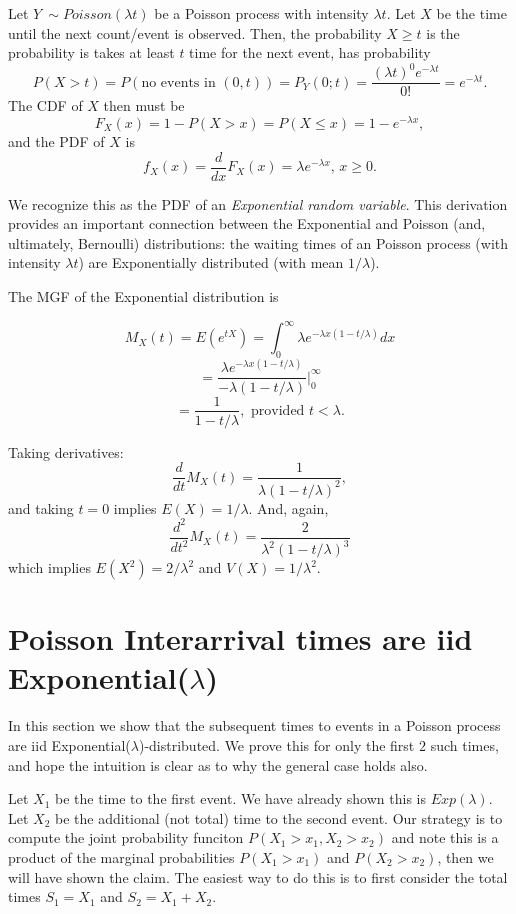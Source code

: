 \documentclass[]{book}
\begin{document}
Let \(Y~\sim Poisson(\lambda t)\) be a Poisson process with intensity
\(\lambda t\). Let \(X\) be the time until the next count/event is
observed. Then, the probability \(X \geq t\) is the probability is takes
at least \(t\) time for the next event, has probability
\[P(X > t) = P(\text{no events in }(0,t)) = P_Y(0;t) = \frac{(\lambda t)^0 e^{-\lambda t}}{0!} = e^{-\lambda t}.\]
The CDF of \(X\) then must be
\[F_X(x) = 1-P(X > x) = P(X\leq x) = 1-e^{-\lambda x},\] and the PDF of
\(X\) is
\[f_X(x) = \frac{d}{dx}F_X(x) = \lambda e^{-\lambda x}, \, x\geq 0.\]

We recognize this as the PDF of an \emph{Exponential random variable}.
This derivation provides an important connection between the Exponential
and Poisson (and, ultimately, Bernoulli) distributions: the waiting
times of an Poisson process (with intensity \(\lambda t\)) are
Exponentially distributed (with mean \(1/\lambda\)).

The MGF of the Exponential distribution is

\[M_X(t) = E(e^{tX})  = \int_{0}^\infty \lambda e^{-\lambda x(1-t/\lambda)}dx\]
\[ = \frac{\lambda e^{-\lambda x(1-t/\lambda)}}{-\lambda (1-t/\lambda)}|_0^\infty\]
\[ = \frac{1}{1-t/\lambda}, \text{ provided }t < \lambda.\]

Taking derivatives:
\[\frac{d}{dt}M_X(t) = \frac{1}{\lambda(1-t/\lambda)^2}, \] and taking
\(t = 0\) implies \(E(X) = 1/\lambda\). And, again,
\[\frac{d^2}{dt^2}M_X(t) = \frac{2}{\lambda^2(1-t/\lambda)^3}\] which
implies \(E(X^2) = 2/\lambda^2\) and \(V(X) = 1/\lambda^2\).

\section{\texorpdfstring{Poisson Interarrival times are iid
Exponential(\(\lambda\))}{Poisson Interarrival times are iid Exponential(\textbackslash{}lambda)}}\label{poisson-interarrival-times-are-iid-exponentiallambda}

In this section we show that the subsequent times to events in a Poisson
process are iid Exponential(\(\lambda\))-distributed. We prove this for
only the first \(2\) such times, and hope the intuition is clear as to
why the general case holds also.

Let \(X_1\) be the time to the first event. We have already shown this
is \(Exp(\lambda)\). Let \(X_2\) be the additional (not total) time to
the second event. Our strategy is to compute the joint probability
funciton \(P(X_1 >x_1, X_2 >x_2)\) and note this is a product of the
marginal probabilities \(P(X_1 >x_1)\) and \(P(X_2 >x_2)\), then we will
have shown the claim. The easiest way to do this is to first consider
the total times \(S_1 = X_1\) and \(S_2 = X_1 + X_2\).
\end{document}
